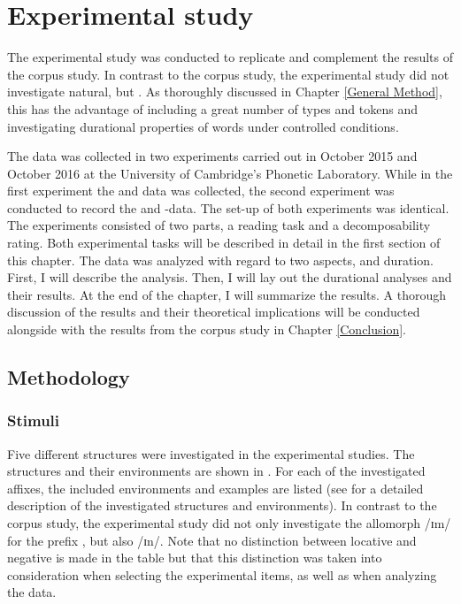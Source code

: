 \chapter{Experimental study} \label{Experimental Studies}


The experimental study was conducted to replicate and complement the results of the corpus study. In contrast to the corpus study, the experimental study did not investigate natural,  but . As thoroughly discussed in Chapter \ref{General Method}, this has the advantage of including a great number of types and tokens and investigating durational properties of words under controlled conditions.

 The data was collected in two experiments carried out in October 2015 and October 2016 at the University of Cambridge's Phonetic Laboratory. While in the first experiment the  and data was collected, the second experiment was conducted to record the  and -data. 
  The set-up of both experiments was identical. The experiments consisted of two parts, a reading task and a decomposability rating. 
 Both experimental tasks will be described in detail in the first section of this chapter.
 The data was analyzed with regard to two aspects,  and duration. First, I will describe the  analysis.  Then, I will lay out the durational analyses and their results. At the end of the chapter, I will summarize the results. A thorough discussion of the results and their theoretical implications will be conducted alongside with the results from the corpus study in Chapter \ref{Conclusion}.



\section{Methodology}


\subsection{Stimuli} \label{stimuli experiment}

 Five different structures were investigated in the experimental studies. The structures and their environments are shown in . For each of the investigated affixes, the included environments and examples are listed (see  for a detailed description of the investigated structures and environments). In contrast to the corpus study, the experimental study did not only investigate the allomorph /ɪm/  for the prefix , but also /ɪn/. Note that no distinction between locative and negative  is made in the table but that this distinction was taken into consideration when selecting the experimental items, as well as when analyzing the data.



